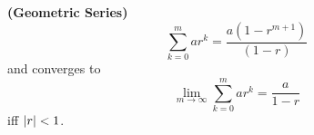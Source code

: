 \begin{identity}
  \textbf{\textup{(Geometric Series)}}
  \begin{equation}
    \sum_{k=0}^m ar^k = \frac{a(1-r^{m+1})}{(1-r)}
    \label{eq:geometric_series}
  \end{equation}
  and converges to 
  \begin{equation*}
    \lim_{m\to\infty} \sum_{k=0}^m ar^k = \frac{a}{1-r}
  \end{equation*}
  iff $\abs{r} < 1$.
\end{identity}